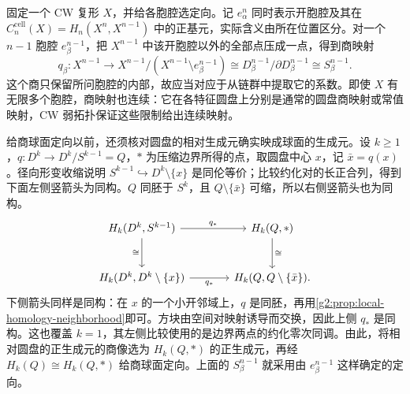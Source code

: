 固定一个 CW 复形 \(X\)，并给各胞腔选定向。记 \(e^n_\alpha\) 同时表示开胞腔及其在 \(C_n^{\mathrm{cell}}(X)=H_n(X^n,X^{n-1})\) 中的正基元，实际含义由所在位置区分。对一个 \(n-1\) 胞腔 \(e^{n-1}_\beta\)，把 \(X^{n-1}\) 中该开胞腔以外的全部点压成一点，得到商映射
\[
	q_\beta:X^{n-1}\longrightarrow
	X^{n-1}/(X^{n-1}\setminus e^{n-1}_\beta)
	\cong D^{n-1}_\beta/\partial D^{n-1}_\beta\cong S^{n-1}_\beta.
\]
这个商只保留所问胞腔的内部，故应当对应于从链群中提取它的系数。即使 \(X\) 有无限多个胞腔，商映射也连续：它在各特征圆盘上分别是通常的圆盘商映射或常值映射，CW 弱拓扑保证这些限制给出连续映射。

\ProseParagraphBreak

给商球面定向以前，还须核对圆盘的相对生成元确实映成球面的生成元。设 \(k\ge1\)，\(q:D^k\to D^k/S^{k-1}=Q\)，\(*\) 为压缩边界所得的点，取圆盘中心 \(x\)，记 \(\bar x=q(x)\)。径向形变收缩说明 \(S^{k-1}\hookrightarrow D^k\setminus\{x\}\) 是同伦等价；比较约化对的长正合列，得到下面左侧竖箭头为同构。\(Q\) 同胚于 \(S^k\)，且 \(Q\setminus\{\bar x\}\) 可缩，所以右侧竖箭头也为同构。
\[
	\begin{tikzcd}[column sep=large,row sep=large]
		H_k(D^k,S^{k-1}) \arrow[r,"q_*"] \arrow[d,"\cong"'] & H_k(Q,*) \arrow[d,"\cong"] \\
		H_k(D^k,D^k\setminus\{x\}) \arrow[r,"q_*"'] & H_k(Q,Q\setminus\{\bar x\}).
	\end{tikzcd}
\]
下侧箭头同样是同构：在 \(x\) 的一个小开邻域上，\(q\) 是同胚，再用\cref{g2:prop:local-homology-neighborhood}即可。方块由空间对映射诱导而交换，因此上侧 \(q_*\) 是同构。这也覆盖 \(k=1\)，其左侧比较使用的是边界两点的约化零次同调。由此，将相对圆盘的正生成元的商像选为 \(H_k(Q,*)\) 的正生成元，再经 \(H_k(Q)\cong H_k(Q,*)\) 给商球面定向。上面的 \(S^{n-1}_\beta\) 就采用由 \(e^{n-1}_\beta\) 这样确定的定向。

